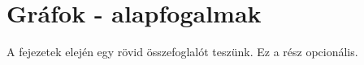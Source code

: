 \chapter{Gráfok - alapfogalmak}\label{ch:ALAP}

\begin{osszefoglal}
	A fejezetek elején egy rövid összefoglalót teszünk. Ez a rész opcionális.
	
\end{osszefoglal}

